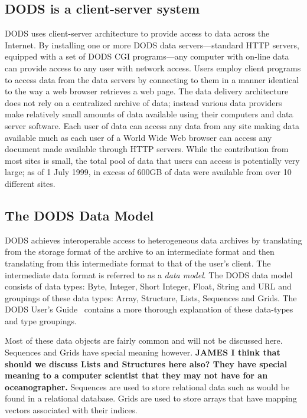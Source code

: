 \documentclass{article}
\begin{document}
\subsection{\ac{DODS} is a client-server system}
\label{cs}


\ac{DODS} uses client-server architecture to provide access to data across
the Internet. By installing one or more \ac{DODS} data servers---standard
\acs{HTTP} servers, equipped with a set of \ac{DODS} \acs{CGI} programs---any
computer with on-line data can provide access to any user with network
access.  Users employ client programs to access data from the data servers by
connecting to them in a manner identical to the way a web browser retrieves a
web page.  The data delivery architecture does not rely on a centralized
archive of data; instead various data providers make relatively small amounts
of data available using their computers and data server software. Each user
of data can access any data from any site making data available much as each
user of a World Wide Web browser can access any document made available
through \acs{HTTP} servers. While the contribution from most sites is small,
the total pool of data that users can access is potentially very large; as of
1 July 1999, in excess of 600GB of data were available from over 10 different
sites.

\subsection{The DODS Data Model}
\label{dm}

\ac{DODS} achieves interoperable access to heterogeneous data archives by
translating from the storage format of the archive to an intermediate format
and then translating from this intermediate format to that of the user's
client. The intermediate data format is referred to as a {\em data model}.
The \ac{DODS} data model consists of data types: Byte, Integer, Short
Integer, Float, String and URL and groupings of these data types: Array,
Structure, Lists, Sequences and Grids. The \ac{DODS} User's
Guide~\cite{dods:users-guide} contains a more thorough explanation of these
data-types and type groupings.

Most of these data objects are fairly common and will not be discussed
here. Sequences and Grids have special meaning however. {\bf JAMES I think
that should we discuss Lists and Structures here also? They have special 
meaning to a computer scientist that they may not have for an oceanographer.}
Sequences are used to store relational data such as would be found in a
relational database. Grids are used to store arrays that have mapping vectors
associated with their indices. 
\end{document}
